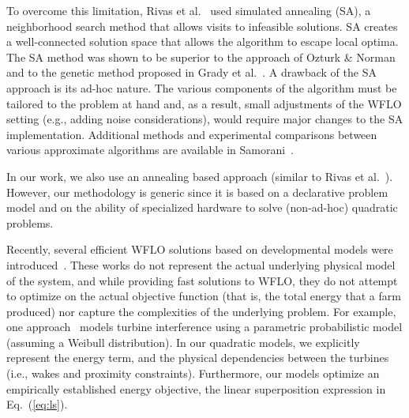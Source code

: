 \documentclass[preprint,12pt]{elsarticle}
\newcommand{\todo}[1]{{\textcolor{red}{\bf {#1}}}}
\begin{document}
To overcome this limitation, Rivas et al.\ \cite{rivas2009solving} used simulated annealing (SA), 
a neighborhood search method that allows visits to infeasible solutions. 
SA creates a well-connected solution space that allows the algorithm to escape 
local optima. The SA method was shown to be superior to the approach of Ozturk \& Norman~\cite{ozturk2004heuristic} 
and to the genetic method proposed in Grady et al.\ \cite{grady2005placement}. A drawback of the SA approach 
is its ad-hoc nature. The various components of the algorithm
 must be tailored to the problem at hand and, as a result, small adjustments of the WFLO setting
 (e.g., adding noise considerations), would require major changes to the SA implementation. 
Additional methods and experimental comparisons between various approximate algorithms are available in Samorani~\cite{samorani2013wind}.

In our work, we also use an annealing based approach (similar to Rivas et al.\ \cite{rivas2009solving}). However,
our methodology is generic since it is based on a declarative problem model and
on the ability of specialized hardware to solve (non-ad-hoc) quadratic problems.


Recently, several efficient WFLO solutions based on developmental models were introduced~\cite{wilson2013learning,wilson2014continuous}. These works do not represent the actual underlying physical model of the system, and while providing fast solutions to WFLO,
they do not attempt to optimize on the actual objective function (that is, the total energy that a farm produced) nor capture the complexities of the underlying problem. For example, one approach~\cite{wilson2013learning} models turbine interference using a parametric probabilistic model (assuming a Weibull distribution). In our quadratic models, we explicitly represent the energy term, and the physical dependencies between the turbines (i.e., wakes and proximity constraints). Furthermore, our models
optimize an empirically established energy objective, the linear superposition expression in Eq.~(\ref{eq:ls}).

\end{document}
